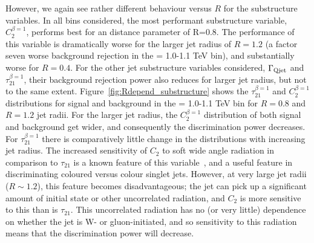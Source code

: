 However, we again see rather
different behaviour versus $R$ for the substructure variables. In all \pT bins
considered, the most performant substructure variable, $C_2^{\beta=1}$,
performs best for an \antikt distance parameter of R=0.8. The
performance of this variable is dramatically worse for the larger jet
radius of $R=1.2$ (a factor seven worse background rejection in
the \pT = 1.0-1.1 TeV bin), and substantially worse for $R=0.4$. For the other
jet substructure variables considered, $\Gamma_{\rm Qjet}$ and
$\tau_{21}^{\beta=1}$, their background rejection
power also reduces for larger jet radius, but not to the same
extent. Figure~\ref{fig:Rdepend_substructure} shows the
$\tau_{21}^{\beta=1}$ and $C_2^{\beta=1}$ distributions for signal and
background in the \pT = 1.0-1.1 TeV bin for $R=0.8$ and $R=1.2$ jet
radii. For the larger jet radius, the
$C_2^{\beta=1}$  distribution of both signal and background get wider,
and consequently the discrimination power decreases. For
$\tau_{21}^{\beta=1}$ there is comparatively little change in the distributions
with increasing jet radius. The increased sensitivity of $C_{2}$ to
soft wide angle radiation in comparison to $\tau_{21}$ is a known
feature of this variable~\cite{Larkoski:2013eya}, and a useful feature
in discriminating coloured versus colour singlet jets. However, at
very large jet radii ($R\sim1.2$), this feature becomes
disadvantageous; the jet can pick up a significant amount of initial
state or other uncorrelated radiation, and $C_{2}$ is more sensitive
to this than is $\tau_{21}$.  This uncorrelated radiation has no (or
very little) dependence on whether the jet is W- or gluon-initiated, and so sensitivity to this radiation means that the discrimination power will decrease.


